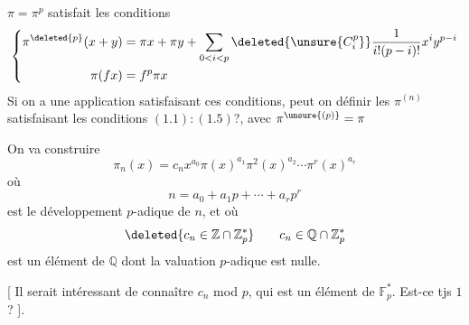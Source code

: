 $\pi=\pi^p$ satisfait les conditions
\[
\left\{\begin{aligned}
\pi^{\deleted{p}}(x+y)&=\pi x+\pi y+\sum_{0<i<p}\deleted{\unsure{C_i^p}}\frac{1}{i!(p-i)!}x^iy^{p-i}\\
\pi(fx)&=f^p\pi x
\end{aligned}\right.
\]
Si on a une application satisfaisant ces conditions, peut on définir les $\pi^{(n)}$  satisfaisant les conditions   $(1.1):(1.5)$?, avec $\pi^{\unsure{(p)}}=\pi$


On va construire
\[
\pi_n(x)=c_nx^{a_0}\pi(x)^{a_1}\pi^2(x)^{a_2}\cdots\pi^r(x)^{a_r}
\]
où
\[
n=a_0+a_1p+\cdots+a_rp^r
\]
est le développement $p$-adique de $n$, et où 
\[
\deleted{c_n\in\mathbb Z\cap\mathbb Z_p^*}\qquad c_n\in\mathbb Q\cap\mathbb Z_p^*
\]
est un élément de $\mathbb Q$ dont la valuation $p$-adique est nulle.

[ Il serait intéressant de connaître $c_n$ mod $p$, qui est un élément de $\mathbb F_p^*$. Est-ce tjs $1$? ].
